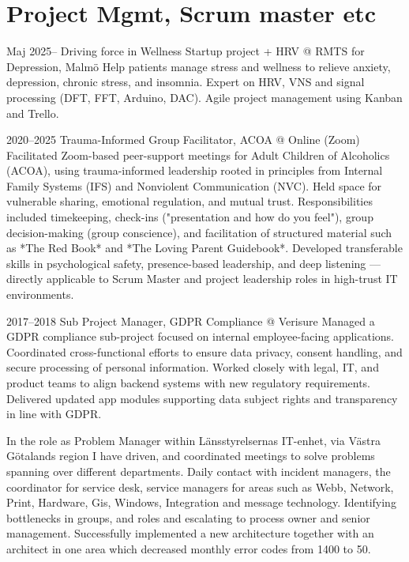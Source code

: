 
\large
\section {Project Mgmt, Scrum master etc}
\cventry
  {Maj 2025–}
  {Driving force in Wellness Startup project + HRV}
  {@ RMTS for Depression, Malmö}
  {} %
  {}
  {Help patients manage stress and wellness to relieve anxiety, depression, chronic stress, and insomnia. 
  Expert on HRV, VNS and signal processing (DFT, FFT, Arduino, DAC). Agile project management using Kanban and Trello.}

\cventry
   {2020–2025}
  {Trauma-Informed Group Facilitator, ACOA}
  {@ Online (Zoom)}
  {}
  {}
  {Facilitated Zoom-based peer-support meetings for Adult Children of Alcoholics (ACOA), using trauma-informed leadership rooted in principles from Internal Family Systems (IFS) and Nonviolent Communication (NVC). Held space for vulnerable sharing, emotional regulation, and mutual trust. Responsibilities included timekeeping, check-ins ("presentation and how do you feel"), group decision-making (group conscience), and facilitation of structured material such as *The Red Book* and *The Loving Parent Guidebook*. Developed transferable skills in psychological safety, presence-based leadership, and deep listening — directly applicable to Scrum Master and project leadership roles in high-trust IT environments.}

\cventry
  {2017–2018}
  {Sub Project Manager, GDPR Compliance}
  {@ Verisure}
  {}
  {}
  {Managed a GDPR compliance sub-project focused on internal employee-facing applications. Coordinated cross-functional efforts to ensure data privacy, consent handling, and secure processing of personal information. Worked closely with legal, IT, and product teams to align backend systems with new regulatory requirements. Delivered updated app modules supporting data subject rights and transparency in line with GDPR.}


In the role as Problem Manager within Länsstyrelsernas IT-enhet, via Västra Götalands region I have driven, and coordinated meetings to solve problems spanning over different departments. Daily contact with incident managers, the coordinator for service desk, service managers for areas such as Webb, Network, Print, Hardware, Gis, Windows, Integration and message technology. Identifying bottlenecks in groups, and roles and escalating to process owner and senior management. Successfully implemented a new architecture together with an architect in one area which decreased monthly error codes from 1400 to 50.  

